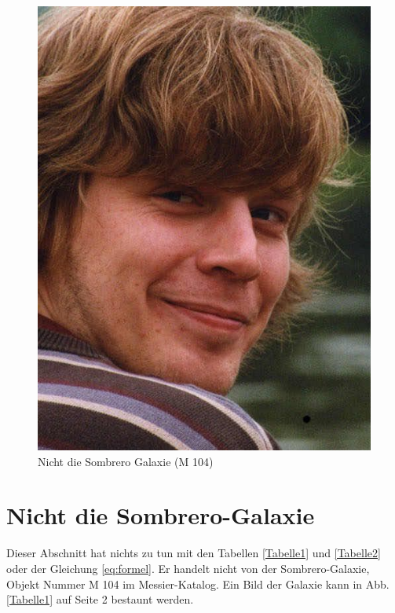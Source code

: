 \documentclass[a4paper, 10pt,onecolumn]{scrartcl}
\begin{document}
\begin{figure}
\centering
\includegraphics[scale=0.25]{tauti.jpg}
\caption{Nicht die Sombrero Galaxie (M 104)}
\end{figure}

\section{Nicht die Sombrero-Galaxie}

Dieser Abschnitt hat nichts zu tun mit den Tabellen \ref{Tabelle1} und \ref{Tabelle2} oder der Gleichung \eqref{eq:formel}. Er handelt nicht von der Sombrero-Galaxie, Objekt Nummer M 104 im Messier-Katalog. Ein Bild der Galaxie kann in Abb. \ref{Tabelle1} auf Seite 2 bestaunt werden.
\end{document}
